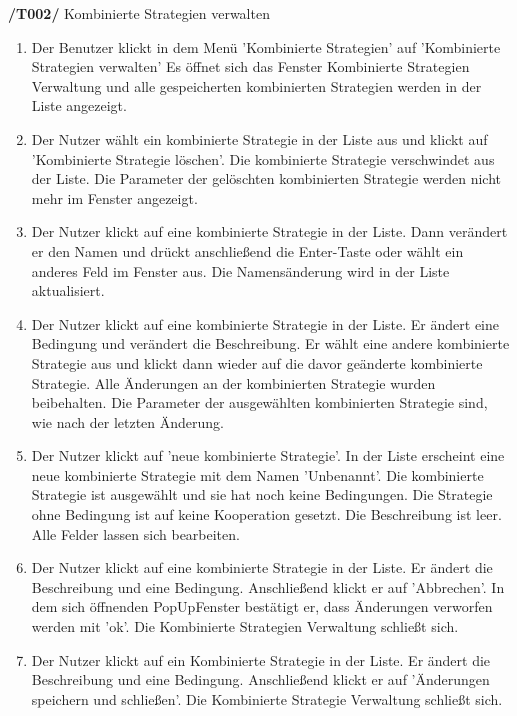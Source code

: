 \textbf{/T002/} Kombinierte Strategien verwalten
\begin{enumerate}
\item {}
{Der Benutzer klickt in dem Menü 'Kombinierte Strategien' auf 'Kombinierte Strategien verwalten'}
{Es öffnet sich das Fenster Kombinierte Strategien Verwaltung und alle gespeicherten kombinierten Strategien werden in der Liste angezeigt.}

\item {}
{Der Nutzer wählt ein kombinierte Strategie in der Liste aus und klickt auf 'Kombinierte Strategie löschen'.}
{Die kombinierte Strategie verschwindet aus der Liste. Die Parameter der gelöschten kombinierten Strategie werden nicht mehr im Fenster angezeigt.}

\item {}
{Der Nutzer klickt auf eine kombinierte Strategie in der Liste. Dann verändert er den Namen und drückt anschließend die Enter-Taste oder wählt ein anderes Feld im Fenster aus.}
{Die Namensänderung wird in der Liste aktualisiert. }

\item {}
{Der Nutzer klickt auf eine kombinierte Strategie in der Liste. Er ändert eine Bedingung und verändert die Beschreibung. Er wählt eine andere kombinierte Strategie aus und klickt dann wieder auf die davor geänderte kombinierte Strategie.}
{Alle Änderungen an der kombinierten Strategie wurden beibehalten. Die Parameter der ausgewählten kombinierten Strategie sind, wie nach der letzten Änderung.}

\item {}
{Der Nutzer klickt auf 'neue kombinierte Strategie'.}
{In der Liste erscheint eine neue kombinierte Strategie mit dem Namen 'Unbenannt'. Die kombinierte Strategie ist ausgewählt und sie hat noch keine Bedingungen. Die Strategie ohne Bedingung ist auf keine Kooperation gesetzt. Die Beschreibung ist leer. Alle Felder lassen sich bearbeiten.}

\item {}
{Der Nutzer klickt auf eine kombinierte Strategie in der Liste. Er ändert die Beschreibung und eine Bedingung. Anschließend klickt er auf 'Abbrechen'. In dem sich öffnenden PopUpFenster bestätigt er, dass Änderungen verworfen werden mit 'ok'.}
{Die Kombinierte Strategien Verwaltung schließt sich.}

\item {}
{Der Nutzer klickt auf ein Kombinierte Strategie in der Liste. Er ändert die Beschreibung und eine Bedingung. Anschließend klickt er auf 'Änderungen speichern und schließen'.}
{Die Kombinierte Strategie Verwaltung schließt sich.}


\end{enumerate}

